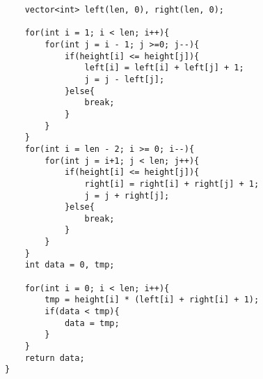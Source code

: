 \begin{description}
\begin{lstlisting}
	vector<int> left(len, 0), right(len, 0);

	for(int i = 1; i < len; i++){
		for(int j = i - 1; j >=0; j--){
			if(height[i] <= height[j]){
				left[i] = left[i] + left[j] + 1;
				j = j - left[j];
			}else{
				break;
			}
		}
	}
	for(int i = len - 2; i >= 0; i--){
		for(int j = i+1; j < len; j++){
			if(height[i] <= height[j]){
				right[i] = right[i] + right[j] + 1;
				j = j + right[j];
			}else{
				break;
			}
		}
	}
	int data = 0, tmp;

	for(int i = 0; i < len; i++){
		tmp = height[i] * (left[i] + right[i] + 1);
		if(data < tmp){
			data = tmp;
		}
	}
	return data;
}
    \end{lstlisting}
\end{description}
